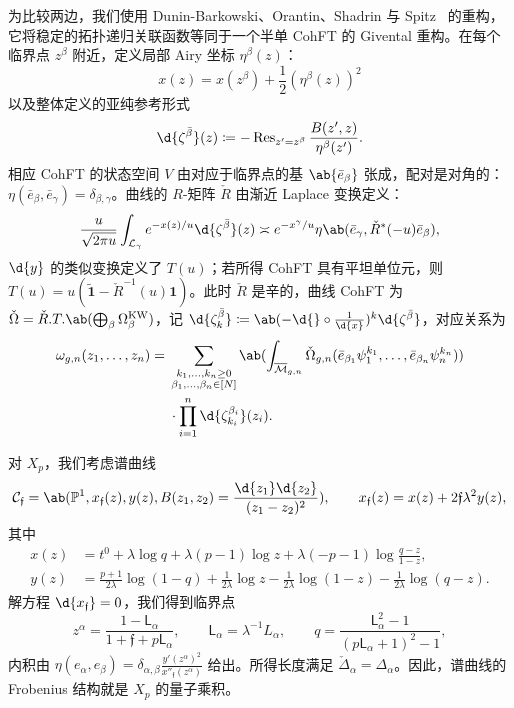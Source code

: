 \documentclass{amsart}
\theoremstyle{definition}
\theoremstyle{remark}
\theoremstyle{plain}
\theoremstyle{definition}
\theoremstyle{remark}
\renewcommand{\P}{\mathbb{P}}
\newcommand{\Mbar}{\overline{\mathcal{M}}}
\newcommand{\mc}[1]{\mathcal{#1}}
\newcommand{\mf}[1]{\mathfrak{#1}}
\newcommand{\mr}[1]{\mathrm{#1}}
\newcommand{\on}[1]{\operatorname{#1}}
\newcommand{\ms}[1]{\mathsf{#1}}
\newcommand{\wt}[1]{\widetilde{#1}}
\newcommand{\1}{\mathbf{1}}
\newcommand{\2}{\mathbf{2}}
\newcommand{\3}{\mathbf{3}}
\begin{document}
为比较两边，我们使用 Dunin-Barkowski、Orantin、Shadrin 与 Spitz~\cite{DOSS2014} 的重构，它将稳定的拓扑递归关联函数等同于一个半单 CohFT 的 Givental 重构。在每个临界点 \(z^{\beta}\) 附近，定义局部 Airy 坐标 \(\eta^{\beta}(z)\)：
\[ x(z) = x(z^{\beta}) + \frac{1}{2}(\eta^{\beta}(z))^2 \]
以及整体定义的亚纯参考形式
\[ \d{\zeta^{\bar{\beta}}}(z) \coloneqq -\on{Res}_{z'=z^{\beta}}\frac{B(z',z)}{\eta^{\beta}(z')}. \]
相应 CohFT 的状态空间 \(V\) 由对应于临界点的基 \(\ab\{\bar{e}_{\beta}\}\) 张成，配对是对角的：\(\eta(\bar{e}_{\beta},\bar{e}_{\gamma}) = \delta_{\beta,\gamma}\)。曲线的 \(R\)-矩阵 \(\check{R}\) 由渐近 Laplace 变换定义：
\[ \frac{u}{\sqrt{2\pi u}}\int_{\mc{L}_{\gamma}} e^{-x(z)/u}\d{\zeta^{\bar{\beta}}}(z) \asymp e^{-x^{\gamma}/u}\eta\ab(\bar{e}_{\gamma}, \check{R}^*(-u)\bar{e}_{\beta}), \]
\(\d{y}\) 的类似变换定义了 \(T(u)\)；若所得 CohFT 具有平坦单位元，则 \(T(u) = u(\wt{\1}-\check{R}^{-1}(u)\1)\)。此时 \(\check{R}\) 是辛的，曲线 CohFT 为 \(\check{\Omega} = \check{R}.T.\ab(\bigoplus_{\beta}\Omega^{\mr{KW}}_{\beta})\)，记 \(\d{\zeta^{\bar{\beta}}_k} \coloneqq \ab(-\d{} \circ \frac{1}{\d{x}})^k \d{\zeta^{\bar{\beta}}}\)，对应关系为
\begin{align*}
    \omega_{g,n}(z_1,\ldots,z_n) ={}& \sum_{\substack{k_1,\ldots,k_n \geq 0 \\ \beta_1,\ldots,\beta_n \in [N]}}\ab(\int_{\Mbar_{g,n}} \check{\Omega}_{g,n}(\bar{e}_{\beta_1}\psi_1^{k_1},\ldots,\bar{e}_{\beta_n}\psi_n^{k_n})) \\
    &\cdot \prod_{i=1}^n \d{\zeta^{\beta_i}_{k_i}}(z_i).
\end{align*}

对 \(X_p\)，我们考虑谱曲线
\[ \mc{C}_{\mf{f}} = \ab(\P^1, x_{\mf{f}}(z), y(z), B(z_1,z_2) = \frac{\d{z_1}\d{z_2}}{(z_1-z_2)^2}), \qquad x_{\mf{f}}(z) = x(z) + 2\mf{f}\lambda^2 y(z), \]
其中
\begin{align*}
    x(z) &= t^0 + \lambda \log q + \lambda(p-1)\log z + \lambda(-p-1)\log\frac{q-z}{1-z}, \\
    y(z) &= \frac{p+1}{2\lambda}\log(1-q) + \frac{1}{2\lambda}\log z - \frac{1}{2\lambda}\log(1-z) - \frac{1}{2\lambda}\log(q-z).
\end{align*}
解方程 \(\d{x_{\mf{f}}} = 0\)，我们得到临界点
\[ z^{\alpha} = \frac{1-\ms{L}_{\alpha}}{1+\mf{f}+p\ms{L}_{\alpha}}, \qquad \ms{L}_{\alpha} = \lambda^{-1}L_{\alpha}, \qquad q = \frac{\ms{L}_{\alpha}^2-1}{(p\ms{L}_{\alpha}+1)^2-1}, \]
内积由 \(\eta(e_{\alpha},e_{\beta}) = \delta_{\alpha,\beta}\frac{y'(z^{\alpha})^2}{x''_{\mf{f}}(z^{\alpha})}\) 给出。所得长度满足 \(\check{\Delta}_{\alpha} = \Delta_{\alpha}\)。因此，谱曲线的 Frobenius 结构就是 \(X_p\) 的量子乘积。
\end{document}
